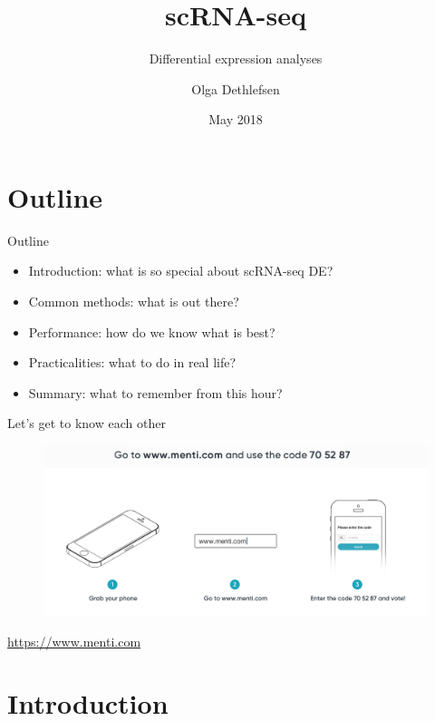 \documentclass{beamer}\usepackage[]{graphicx}\usepackage[]{color}
\title[scRNA-seq DE]{scRNA-seq}
\subtitle{Differential expression analyses}
\author[Olga]{Olga Dethlefsen}
\institute[NBIS]{NBIS, National Bioinformatics Infrastructure Sweden\\}
\date[May 2018]{May 2018}
\begin{document}
\begin{frame}
\titlepage
\end{frame}

\logo{}

\section{Outline}
\begin{frame}
\begin{block}{Outline}
\begin{itemize}  \pause
  \item Introduction: what is so special about scRNA-seq DE? \pause
  \item Common methods: what is out there? \pause
  \item Performance: how do we know what is best? \pause
  \item Practicalities: what to do in real life? \pause
  \item Summary: what to remember from this hour? 
 \end{itemize}
\end{block}
\end{frame}

\begin{frame}
\begin{center}
Let's get to know each other
\begin{figure}
\includegraphics[width=12cm]{Images/menti.png}
\end{figure}
\href{https://www.menti.com}{https://www.menti.com}
\end{center}
\end{frame}

\section{Introduction}
\begin{frame}
\begin{center}
\insertsection
\end{center}
\end{frame}
\end{document}

